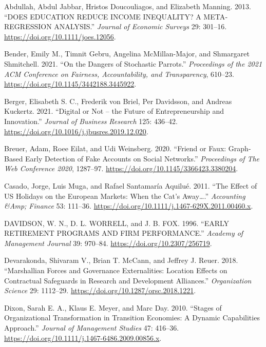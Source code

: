 \documentclass[
  12pt,
]{article}
\newlength{\cslhangindent}
\newenvironment{CSLReferences}[2] %
 {\begin{list}{}{%
  \setlength{\itemindent}{0pt}
  \setlength{\leftmargin}{0pt}
  \setlength{\parsep}{0pt}
  \ifodd #1
   \setlength{\leftmargin}{\cslhangindent}
   \setlength{\itemindent}{-1\cslhangindent}
  \fi
  \setlength{\itemsep}{#2\baselineskip}}}
 {\end{list}}
\begin{document}
\label{refs}
\begin{CSLReferences}{1}{0}
Abdullah, Abdul Jabbar, Hristos Doucouliagos, and Elizabeth Manning.
2013. {``DOES EDUCATION REDUCE INCOME INEQUALITY? A META‐REGRESSION
ANALYSIS.''} \emph{Journal of Economic Surveys} 29: 301--16.
\url{https://doi.org/10.1111/joes.12056}.

Bender, Emily M., Timnit Gebru, Angelina McMillan-Major, and Shmargaret
Shmitchell. 2021. {``On the Dangers of Stochastic Parrots.''}
\emph{Proceedings of the 2021 ACM Conference on Fairness,
Accountability, and Transparency}, 610--23.
\url{https://doi.org/10.1145/3442188.3445922}.

Berger, Elisabeth S. C., Frederik von Briel, Per Davidsson, and Andreas
Kuckertz. 2021. {``Digital or Not -- the Future of Entrepreneurship and
Innovation.''} \emph{Journal of Business Research} 125: 436--42.
\url{https://doi.org/10.1016/j.jbusres.2019.12.020}.

Breuer, Adam, Roee Eilat, and Udi Weinsberg. 2020. {``Friend or Faux:
Graph-Based Early Detection of Fake Accounts on Social Networks.''}
\emph{Proceedings of The Web Conference 2020}, 1287--97.
\url{https://doi.org/10.1145/3366423.3380204}.

Casado, Jorge, Luis Muga, and Rafael Santamaría Aquilué. 2011. {``The
Effect of US Holidays on the European Markets: When the Cat's
Away\ldots{}.''} \emph{Accounting \&Amp; Finance} 53: 111--36.
\url{https://doi.org/10.1111/j.1467-629X.2011.00460.x}.

DAVIDSON, W. N., D. L. WORRELL, and J. B. FOX. 1996. {``EARLY RETIREMENT
PROGRAMS AND FIRM PERFORMANCE.''} \emph{Academy of Management Journal}
39: 970--84. \url{https://doi.org/10.2307/256719}.

Devarakonda, Shivaram V., Brian T. McCann, and Jeffrey J. Reuer. 2018.
{``Marshallian Forces and Governance Externalities: Location Effects on
Contractual Safeguards in Research and Development Alliances.''}
\emph{Organization Science} 29: 1112--29.
\url{https://doi.org/10.1287/orsc.2018.1221}.

Dixon, Sarah E. A., Klaus E. Meyer, and Marc Day. 2010. {``Stages of
Organizational Transformation in Transition Economies: A Dynamic
Capabilities Approach.''} \emph{Journal of Management Studies} 47:
416--36. \url{https://doi.org/10.1111/j.1467-6486.2009.00856.x}.


\end{CSLReferences}
\end{document}
